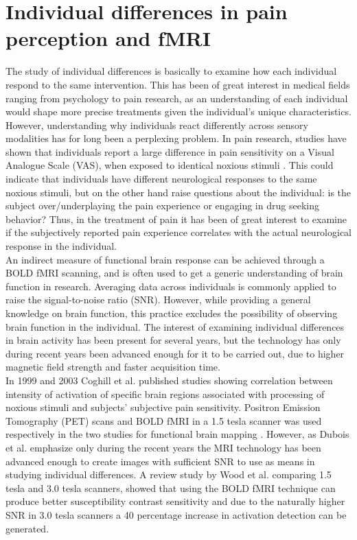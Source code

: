 \section{Individual differences in pain perception and fMRI}
The study of individual differences is basically to examine how each individual respond to the same intervention. This has been of great interest in medical fields ranging from psychology to pain research, as an understanding of each individual would shape more precise treatments given the individual’s unique characteristics. However, understanding why individuals react differently across sensory modalities has for long been a perplexing problem. In pain research, studies have shown that individuals report a large difference in pain sensitivity on a Visual Analogue Scale (VAS), when exposed to identical noxious stimuli \cite{Nielsen2008, Coghill2003}. This could indicate that individuals have different neurological responses to the same noxious stimuli, but on the other hand raise questions about the individual: is the subject over/underplaying the pain experience or engaging in drug seeking behavior? Thus, in the treatment of pain it has been of great interest to examine if the subjectively reported pain experience correlates with the actual neurological response in the individual. \cite{Coghill2011} \\
An indirect measure of functional brain response can be achieved through a BOLD fMRI scanning, and is often used to get a generic understanding of brain function in research. Averaging data across individuals is commonly applied to raise the signal-to-noise ratio (SNR). However, while providing a general knowledge on brain function, this practice excludes the possibility of observing brain function in the individual. The interest of examining individual differences in brain activity has been present for several years, but the technology has only during recent years been advanced enough for it to be carried out, due to higher magnetic field strength and faster acquisition time. \cite{Dubois2016} \\
In 1999 and 2003 Coghill et al. \cite{Coghill1999, Coghill2003} published studies showing correlation between intensity of activation of specific brain regions associated with processing of noxious stimuli and subjects’ subjective pain sensitivity. Positron Emission Tomography (PET) scans and BOLD fMRI in a 1.5 tesla scanner was used respectively in the two studies for functional brain mapping . However, as Dubois et al. \cite{Dubois2016} emphasize only during the recent years the MRI technology has been advanced enough to create images with sufficient SNR to use as means in studying individual differences. A review study by Wood et al. \cite{Wood2012} comparing 1.5 tesla and 3.0 tesla scanners, showed that using the BOLD fMRI technique can produce better susceptibility contrast sensitivity and due to the naturally higher SNR in 3.0 tesla scanners a 40 percentage increase in activation detection can be generated. \\
